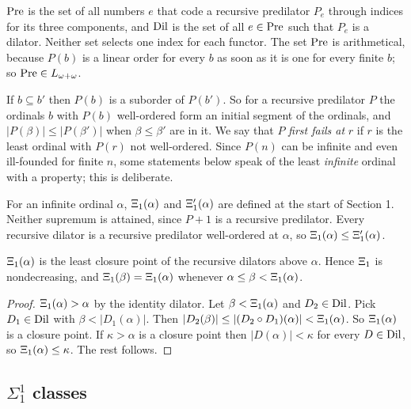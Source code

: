 \documentclass[11pt]{article}
\begin{document}
$\mathrm{Pre}$ is the set of all numbers $e$ that code a recursive predilator $P_e$ through indices for its three
components, and $\mathrm{Dil}$ is the set of all $e \in \mathrm{Pre}$ such that $P_e$ is a dilator. Neither set selects one index
for each functor. The set $\mathrm{Pre}$ is arithmetical, because $P(b)$ is a linear order for every $b$ as soon as it
is one for every finite $b$; so $\mathrm{Pre} \in L_{\omega + \omega}$.

If $b \subseteq b'$ then $P(b)$ is a suborder of $P(b')$. So for a recursive predilator $P$ the ordinals $b$ with
$P(b)$ well-ordered form an initial segment of the ordinals, and $|P(\beta)| \le |P(\beta')|$ when
$\beta \le \beta'$ are in it. We say that $P$ \emph{first fails at} $r$ if $r$ is the least ordinal with $P(r)$
not well-ordered. Since $P(n)$ can be infinite and even ill-founded for finite $n$, some statements below speak of
the least \emph{infinite} ordinal with a property; this is deliberate.

For an infinite ordinal $\alpha$, $\Xi_1(\alpha)$ and $\Xi'_1(\alpha)$ are defined at the start of Section 1. Neither supremum
is attained, since $P + 1$ is a recursive predilator. Every recursive dilator is a recursive predilator
well-ordered at $\alpha$, so $\Xi_1(\alpha) \le \Xi'_1(\alpha)$.

\begin{statement} $\Xi_1(\alpha)$ is the least closure point of the recursive dilators above $\alpha$.
Hence $\Xi_1$ is nondecreasing, and $\Xi_1(\beta) = \Xi_1(\alpha)$ whenever $\alpha \le \beta < \Xi_1(\alpha)$.
\end{statement}

\begin{proof} $\Xi_1(\alpha) > \alpha$ by the identity dilator. Let $\beta < \Xi_1(\alpha)$ and $D_2 \in \mathrm{Dil}$. Pick
$D_1 \in \mathrm{Dil}$ with $\beta < |D_1(\alpha)|$. Then $|D_2(\beta)| \le |(D_2 \circ D_1)(\alpha)| < \Xi_1(\alpha)$. So
$\Xi_1(\alpha)$ is a closure point. If $\kappa > \alpha$ is a closure point then $|D(\alpha)| < \kappa$ for every
$D \in \mathrm{Dil}$, so $\Xi_1(\alpha) \le \kappa$. The rest follows.
\end{proof}

\subsection{$\Sigma^1_1$ classes}
\end{document}

